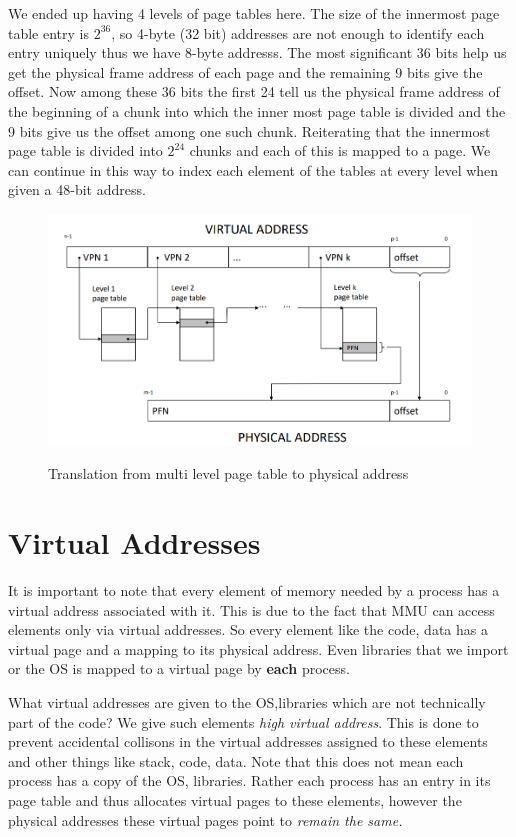 \documentclass[12pt]{article}
\begin{document}
We ended up having 4 levels of page tables here. The size of the innermost page table entry is \(2^{36}\), so 4-byte (32 bit) addresses are not enough to identify each entry uniquely thus we have 8-byte addresss.  The most significant 36 bits help us get the physical frame address of each page and the remaining 9 bits give the offset.
Now among these 36 bits the first 24 tell us the physical frame address of the beginning of a chunk into which the inner most page table is divided and the 9 bits give us the offset among one such chunk. Reiterating that the innermost page table is divided into \(2^{24}\) chunks and each of this is mapped to a page. We can continue in this way to 
index each element of the tables at every level when given a 48-bit address.
 
\begin{figure}[h]
    \begin{center}
        \includegraphics[width = 12cm]{mulit_level_page.png}
        \label{figure:multi_level_page_table}
        \caption{Translation from multi level page table to physical address }
    \end{center}
\end{figure}

\section{Virtual Addresses}
It is important to note that every element of memory needed by a process has a virtual address associated with it. This is due to the fact that MMU can access elements only via
virtual addresses. So every element like the code, data has a virtual page and a mapping to its physical address. Even libraries that we import or the OS is mapped to a virtual
page by \textbf{each} process.

What virtual addresses are given to the OS,libraries which are not technically part of the code? We give such elements \textit{high virtual address}. This is done to prevent accidental
collisons in the virtual addresses assigned to these elements and other things like stack, code, data. Note that this does not mean each process has a copy of the OS, libraries. Rather each process
has an entry in its page table and thus allocates virtual pages to these elements, however the physical addresses these virtual pages point to \textit{remain the same.}
\end{document}
